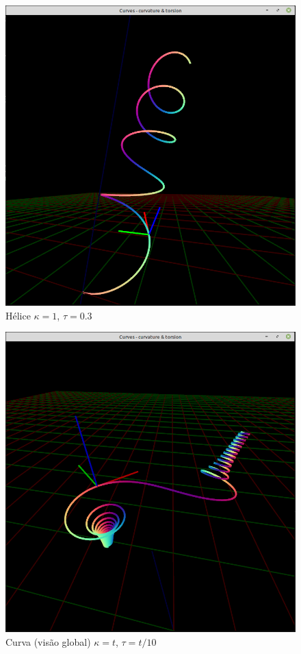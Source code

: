 \documentclass{article}
\begin{document}
\begin{figure}[H]
    \centering
    \includegraphics[scale = 0.5]{img/helix.png}
    \caption{Hélice $\kappa = 1$, $\tau = 0.3$}
\end{figure}

\begin{figure}[H]
    \centering
    \includegraphics[scale = 0.5]{img/global.png}
    \caption{Curva (visão global) $\kappa = t$, $\tau = t/10$}
\end{figure}
\end{document}
